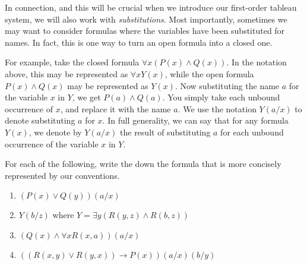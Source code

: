 In connection, and this will be crucial when we introduce our first-order tableau system, we will also work with \textit{substitutions}. Most importantly, sometimes we may want to consider formulas where the variables have been substituted for names. In fact, this is one way to turn an open formula into a closed one. 

For example, take the closed formula $\forall x (P(x) \wedge Q(x))$. In the notation above, this may be represented as $\forall x Y(x)$, while the open formula $P(x) \wedge Q(x)$ may be represented as $Y(x)$. Now substituting the name $a$ for the variable $x$ in $Y$, we get $P(a) \wedge Q(a)$. You simply take each unbound occurrence of $x$, and replace it with the name $a$. We use the notation $Y(a/x)$ to denote substituting $a$ for $x$. In full generality, we can say that for any formula $Y(x)$, we denote by $Y(a/x)$ the result of substituting $a$ for each unbound occurrence of the variable $x$ in $Y$.  

\begin{exc}
For each of the following, write the down the formula that is more concisely represented by our conventions. 

\begin{enumerate}
	\item $(P(x) \vee Q(y))(a/x)$
	\item $Y(b/z)$ where $Y=\exists y (R(y, z) \wedge R(b, z))$
	\item $(Q(x) \wedge \forall x R(x, a))(a/x)$
	\item $((R(x, y) \vee R(y, x)) \rightarrow P(x))(a/x)(b/y)$
\end{enumerate}
\end{exc}